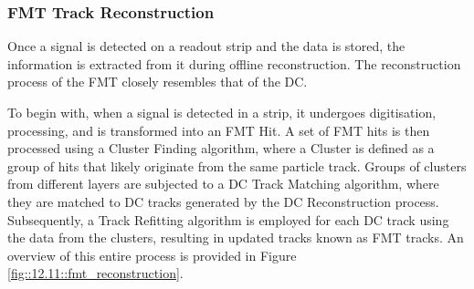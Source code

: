 \subsubsection{FMT Track Reconstruction}
\label{12.11::fmt_track_reconstruction}
    Once a signal is detected on a readout strip and the data is stored, the information is extracted from it during offline reconstruction.
    The reconstruction process of the FMT closely resembles that of the DC.

    To begin with, when a signal is detected in a strip, it undergoes digitisation, processing, and is transformed into an FMT Hit.
    A set of FMT hits is then processed using a Cluster Finding algorithm, where a Cluster is defined as a group of hits that likely originate from the same particle track.
    Groups of clusters from different layers are subjected to a DC Track Matching algorithm, where they are matched to DC tracks generated by the DC Reconstruction process.
    Subsequently, a Track Refitting algorithm is employed for each DC track using the data from the clusters, resulting in updated tracks known as FMT tracks.
    An overview of this entire process is provided in Figure \ref{fig::12.11::fmt_reconstruction}.

